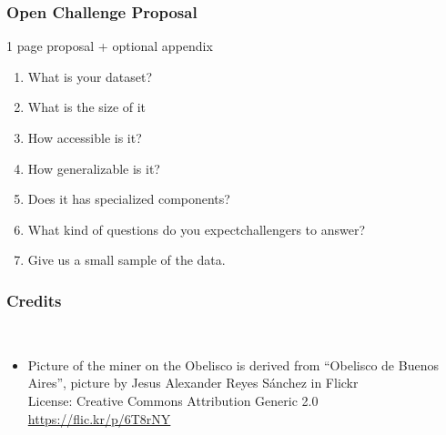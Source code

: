 \documentclass{beamer}
\begin{document}
\begin{frame}
\frametitle{Open Challenge Proposal}

{\Large
1 page proposal + optional appendix

\begin{enumerate}
\item What is your dataset?
\item What is the size of it
\item How accessible is it?
\item How generalizable is it?
\item Does it has specialized components?
\item What kind of questions do you expectchallengers to answer?
\item Give us a small sample of the data.
\end{enumerate}
}

\end{frame}

\begin{frame}
\frametitle{Credits}

~
\vspace{4cm}

\begin{itemize}
\item {\small Picture of the miner on the Obelisco is derived from
  ``Obelisco de Buenos Aires'', picture by Jesus Alexander Reyes Sánchez in Flickr \\
  License: Creative Commons Attribution Generic 2.0 \\}
  {\footnotesize \url{https://flic.kr/p/6T8rNY}}
\end{itemize}

\end{frame}
\end{document}
